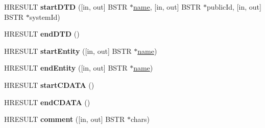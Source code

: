 \begin{DoxyCompactItemize}
\item 
\mbox{\label{interface_m_s_x_m_l2_1_1_i_v_b_s_a_x_lexical_handler_a4fe6f1c475f02a3edefbf71afe5c838c}} 
H\+R\+E\+S\+U\+LT {\bfseries start\+D\+TD} (\mbox{[}in, out\mbox{]} B\+S\+TR $\ast$\hyperlink{structname}{name}, \mbox{[}in, out\mbox{]} B\+S\+TR $\ast$public\+Id, \mbox{[}in, out\mbox{]} B\+S\+TR $\ast$system\+Id)
\item 
\mbox{\label{interface_m_s_x_m_l2_1_1_i_v_b_s_a_x_lexical_handler_a13c57463536cff3611f415c6c849b865}} 
H\+R\+E\+S\+U\+LT {\bfseries end\+D\+TD} ()
\item 
\mbox{\label{interface_m_s_x_m_l2_1_1_i_v_b_s_a_x_lexical_handler_ab4feafb5e4d1f6e3b2f09828fc5771d9}} 
H\+R\+E\+S\+U\+LT {\bfseries start\+Entity} (\mbox{[}in, out\mbox{]} B\+S\+TR $\ast$\hyperlink{structname}{name})
\item 
\mbox{\label{interface_m_s_x_m_l2_1_1_i_v_b_s_a_x_lexical_handler_afc51519a1ea1746a5ea3128425f046e9}} 
H\+R\+E\+S\+U\+LT {\bfseries end\+Entity} (\mbox{[}in, out\mbox{]} B\+S\+TR $\ast$\hyperlink{structname}{name})
\item 
\mbox{\label{interface_m_s_x_m_l2_1_1_i_v_b_s_a_x_lexical_handler_aa97620e252521ce7efa16d69c94826f0}} 
H\+R\+E\+S\+U\+LT {\bfseries start\+C\+D\+A\+TA} ()
\item 
\mbox{\label{interface_m_s_x_m_l2_1_1_i_v_b_s_a_x_lexical_handler_a190fe5a696cd876e55df8bf2c6bf05e4}} 
H\+R\+E\+S\+U\+LT {\bfseries end\+C\+D\+A\+TA} ()
\item 
\mbox{\label{interface_m_s_x_m_l2_1_1_i_v_b_s_a_x_lexical_handler_a7b98e1a43862124dbae3a3a39eca6575}} 
H\+R\+E\+S\+U\+LT {\bfseries comment} (\mbox{[}in, out\mbox{]} B\+S\+TR $\ast$chars)
\item 
\mbox{\label{interface_m_s_x_m_l2_1_1_i_v_b_s_a_x_lexical_handler_a4fe6f1c475f02a3edefbf71afe5c838c}} 

\end{DoxyCompactItemize}
